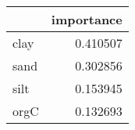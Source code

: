 \begin{tabular}{lr}
\toprule
 & importance \\
\midrule
clay & 0.410507 \\
sand & 0.302856 \\
silt & 0.153945 \\
orgC & 0.132693 \\
\bottomrule
\end{tabular}
